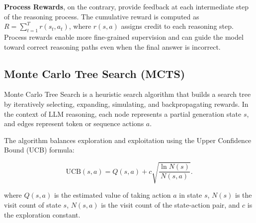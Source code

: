 \textbf{Process Rewards}, on the contrary, provide feedback at each intermediate step of the reasoning process. The cumulative reward is computed as $R = \sum_{t=1}^{T} r(s_t, a_t)$, where $r(s, a)$ assigns credit to each reasoning step. Process rewards enable more fine-grained supervision and can guide the model toward correct reasoning paths even when the final answer is incorrect.

\subsection{Monte Carlo Tree Search (MCTS)}

Monte Carlo Tree Search \cite{Xie2024MonteCT} is a heuristic search algorithm that builds a search tree by iteratively selecting, expanding, simulating, and backpropagating rewards. In the context of LLM reasoning, each node represents a partial generation state $s$, and edges represent token or sequence actions $a$.

The algorithm balances exploration and exploitation using the Upper Confidence Bound (UCB) formula:

\begin{equation}
\mathrm{UCB}(s, a)
=
Q(s, a)
+
c \sqrt{
\frac{\ln N(s)}{N(s, a)}
}.
\end{equation}

where $Q(s, a)$ is the estimated value of taking action $a$ in state $s$, $N(s)$ is the visit count of state $s$, $N(s, a)$ is the visit count of the state-action pair, and $c$ is the exploration constant.
